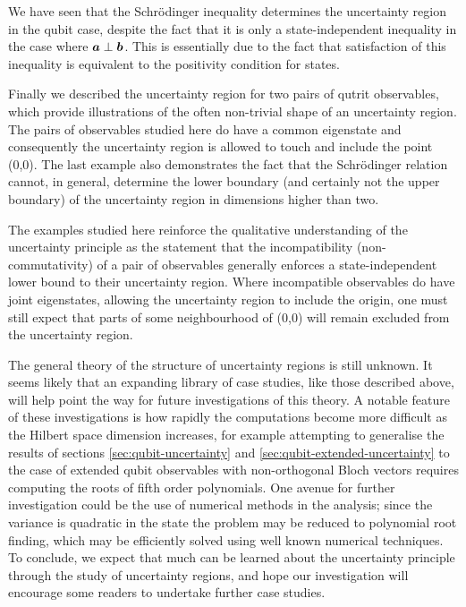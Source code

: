 We have seen that the Schr\"odinger inequality determines the uncertainty region in the qubit case, despite the fact that it is only a state-independent inequality in the case where $\bm{a}\perp\bm{b}$. This is essentially due to the fact that satisfaction of this inequality is equivalent to the positivity condition for states.

Finally we described the uncertainty region for two pairs of qutrit observables, which provide illustrations of the often non-trivial shape of an uncertainty region. The pairs of observables studied here do have a common eigenstate and consequently the uncertainty region is allowed to touch and include the point (0,0). The last example also demonstrates the fact that the Schr\"odinger relation cannot, in general, determine the lower boundary (and certainly not the upper boundary) of the uncertainty region in dimensions higher than two.

The examples studied here reinforce the qualitative understanding of  the uncertainty principle  as the statement that the incompatibility (non-commutativity) of a pair of observables generally enforces a state-independent lower bound to their uncertainty region. Where incompatible observables do have joint eigenstates, allowing the uncertainty region to include the origin, one must still expect that parts of some neighbourhood of (0,0) will remain excluded from the uncertainty region. 

The general theory of the structure of uncertainty regions is still unknown. It seems likely that an expanding library of case studies, like those described above, will help point the way for future investigations of this theory. A notable feature of these investigations is how rapidly the computations become more difficult as the Hilbert space dimension increases, for example attempting to generalise the results of sections \ref{sec:qubit-uncertainty} and \ref{sec:qubit-extended-uncertainty} to the case of extended qubit observables with non-orthogonal Bloch vectors requires computing the roots of fifth order polynomials. One avenue for further investigation could be the use of numerical methods in the analysis; since the variance is quadratic in the state the problem may be reduced to polynomial root finding, which may be efficiently solved using well known numerical techniques.
To conclude, we expect that much can be learned about the uncertainty principle through the study of uncertainty regions, and hope our investigation will encourage some readers to undertake further case studies.

